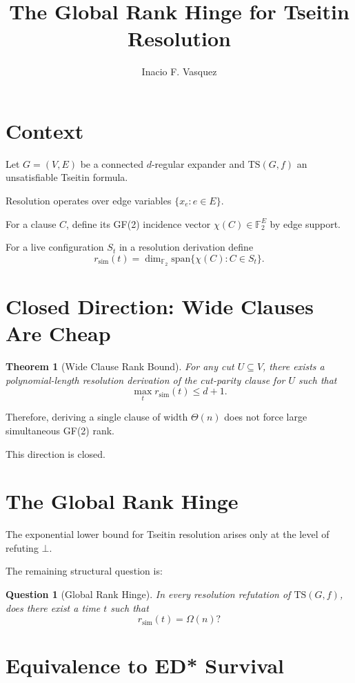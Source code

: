 \documentclass[11pt]{article}
\title{The Global Rank Hinge for Tseitin Resolution}
\author{Inacio F. Vasquez}
\date{}
\newtheorem{theorem}{Theorem}
\newtheorem{question}{Question}
\begin{document}
\maketitle

\section{Context}

Let $G=(V,E)$ be a connected $d$-regular expander and
$\mathrm{TS}(G,f)$ an unsatisfiable Tseitin formula.

Resolution operates over edge variables $\{x_e : e\in E\}$.

For a clause $C$, define its GF(2) incidence vector
$\chi(C)\in\mathbb{F}_2^{E}$ by edge support.

For a live configuration $S_t$ in a resolution derivation define
\[
r_{\mathrm{sim}}(t)
=
\dim_{\mathbb{F}_2}
\mathrm{span}\{\chi(C) : C\in S_t\}.
\]

\section{Closed Direction: Wide Clauses Are Cheap}

\begin{theorem}[Wide Clause Rank Bound]
For any cut $U\subseteq V$,
there exists a polynomial-length resolution derivation of the
cut-parity clause for $U$ such that
\[
\max_t r_{\mathrm{sim}}(t) \le d+1.
\]
\end{theorem}

Therefore, deriving a single clause of width $\Theta(n)$
does not force large simultaneous GF(2) rank.

This direction is closed.

\section{The Global Rank Hinge}

The exponential lower bound for Tseitin resolution
arises only at the level of refuting $\bot$.

The remaining structural question is:

\begin{question}[Global Rank Hinge]
In every resolution refutation of $\mathrm{TS}(G,f)$,
does there exist a time $t$ such that
\[
r_{\mathrm{sim}}(t) = \Omega(n)?
\]
\end{question}

\section{Equivalence to ED* Survival}
\end{document}
